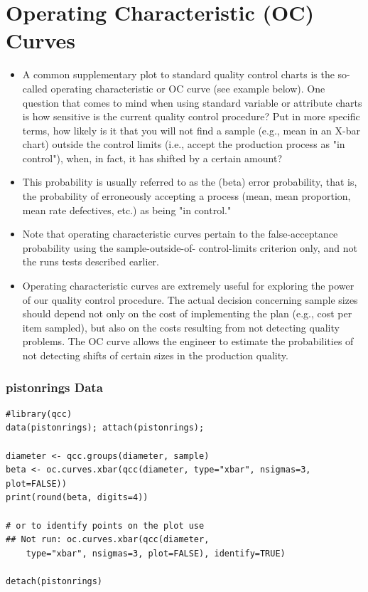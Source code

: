 \documentclass[SPC-MASTER.tex]{subfiles}
\begin{document}
\section*{Operating Characteristic (OC) Curves}
\begin{itemize}
\item A common supplementary plot to standard quality control charts is the so-called operating characteristic or OC curve (see example below). One question that comes to mind when using standard variable or attribute charts is how sensitive is the current quality control procedure? Put in more specific terms, how likely is it that you will not find a sample (e.g., mean in an X-bar chart) outside the control limits (i.e., accept the production process as "in control"), when, in fact, it has shifted by a certain amount? 

\item This probability is usually referred to as the  (beta) error probability, that is, the probability of erroneously accepting a process (mean, mean proportion, mean rate defectives, etc.) as being "in control." 

\item Note that operating characteristic curves pertain to the false-acceptance probability using the sample-outside-of- control-limits criterion only, and not the runs tests described earlier.


\item Operating characteristic curves are extremely useful for exploring the power of our quality control procedure. The actual decision concerning sample sizes should depend not only on the cost of implementing the plan (e.g., cost per item sampled), but also on the costs resulting from not detecting quality problems. The OC curve allows the engineer to estimate the probabilities of not detecting shifts of certain sizes in the production quality.
\end{itemize}

\subsubsection*{pistonrings Data}
\begin{framed}
\begin{verbatim}
#library(qcc)
data(pistonrings); attach(pistonrings);

diameter <- qcc.groups(diameter, sample)
beta <- oc.curves.xbar(qcc(diameter, type="xbar", nsigmas=3, plot=FALSE))
print(round(beta, digits=4))

# or to identify points on the plot use
## Not run: oc.curves.xbar(qcc(diameter, 
    type="xbar", nsigmas=3, plot=FALSE), identify=TRUE)

detach(pistonrings)
\end{verbatim}
\end{framed}
\end{document}
